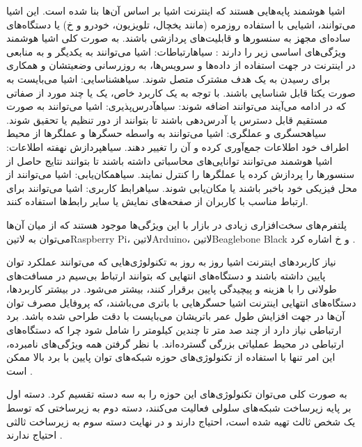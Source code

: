 اشیا هوشمند پایه‌هایی هستند که اینترنت اشیا بر اساس آن‌ها بنا شده است. این اشیا می‌توانند، اشیایی با استفاده روزمره (مانند یخچال، تلویزیون، خودرو و ‌خ) یا دستگاه‌های ساده‌ای مجهز به
سنسورها و قابلیت‌های پردازشی باشند. به صورت کلی اشیا هوشمند ویژگی‌های اساسی زیر را دارند
:
 ‌سیاه{ارتباطات}: اشیا می‌توانند به یکدیگر و به منابعی در اینترنت در جهت استفاده از داده‌ها و سرویس‌ها، به روزرسانی وضعیتشان و همکاری برای رسیدن به یک هدف مشترک متصل شوند.
 ‌سیاه{شناسایی}: اشیا می‌بایست به صورت یکتا قابل شناسایی باشند.
با توجه به یک کاربرد خاص، یک یا چند مورد از صفاتی که در ادامه می‌آیند می‌توانند اضافه شوند:
 ‌سیاه{آدرس‌پذیری}: اشیا می‌توانند به صورت مستقیم قابل دسترس یا آدرس‌دهی باشند تا بتوانند از دور تنظیم یا تحقیق شوند.
 ‌سیاه{حسگری و عملگری}: اشیا می‌توانند به واسطه حسگرها و عملگرها از محیط اطراف خود اطلاعات جمع‌آوری کرده و آن را تغییر دهند.
 ‌سیاه{پردازش نهفته اطلاعات}: اشیا هوشمند می‌توانند توانایی‌های محاسباتی داشته باشند تا بتوانند نتایج حاصل از سنسورها را پردازش کرده یا عملگرها را کنترل نمایند.
 ‌سیاه{مکان‌یابی}: اشیا می‌توانند از محل فیزیکی خود باخبر باشند یا مکان‌یابی شوند.
 ‌سیاه{رابط کاربری}: اشیا می‌توانند برای ارتباط مناسب با کاربران از صفحه‌های نمایش یا سایر رابط‌ها استفاده کنند.

پلتفرم‌های سخت‌افزاری زیادی در بازار با این ویژگی‌ها موجود هستند که از میان آن‌ها می‌توان به ‌لاتین{Raspberry Pi}، ‌لاتین{Arduino}، ‌لاتین{Beaglebone Black} و ‌خ اشاره کرد
.


نیاز کاربردهای اینترنت اشیا روز به روز به تکنولوژی‌هایی که می‌توانند عملکرد توان پایین داشته باشند
و دستگاه‌های انتهایی که بتوانند ارتباط بی‌سیم در مسافت‌های طولانی را با هزینه و پیچیدگی پایین برقرار کنند، بیشتر می‌شود.
در بیشتر کاربردها، دستگاه‌های انتهایی اینترنت اشیا حسگرهایی با باتری می‌باشند، که پروفایل مصرف توان آن‌ها در جهت افزایش طول عمر
باتریشان می‌بایست با دقت طراحی شده باشد.
برد ارتباطی نیاز دارد از چند صد متر تا چندین کیلومتر را شامل شود چرا که دستگاه‌های ارتباطی در محیط عملیاتی بزرگی گسترده‌اند.
با نظر گرفتن همه ویژگی‌های نامبرده، این امر تنها با استفاده از تکنولوژی‌های حوزه شبکه‌های توان پایین با برد بالا ممکن است
.

به صورت کلی می‌توان تکنولوژی‌های این حوزه را به سه دسته تقسیم کرد. دسته اول بر پایه زیرساخت شبکه‌های سلولی فعالیت می‌کنند،
دسته دوم به زیرساختی که توسط یک شخص ثالث تهیه شده است، احتیاج دارند و در نهایت دسته سوم به زیرساخت ثالثی احتیاج ندارند
.

